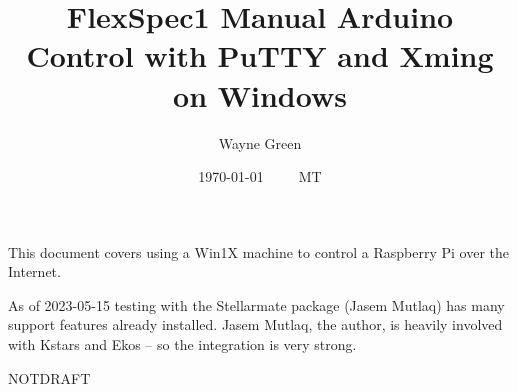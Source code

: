\documentclass[letter,11pt,oneside]{article}
\def\documentisdraft{NOTDRAFT}
\begin{document}


\title{FlexSpec1 Manual Arduino Control with PuTTY and Xming on Windows}
\author{Wayne Green}
\date{\today ~ ~ \currenttime~ MT}
\maketitle

This document covers using a Win1X machine to control a Raspberry Pi
over the Internet. 

As of 2023-05-15 testing with the Stellarmate package (Jasem Mutlaq)
has many support features already installed. Jasem Mutlaq, the author,
is heavily involved with Kstars and Ekos -- so the integration is
very strong.


 
\tableofcontents
\listoffigures
\newpage


\setcounter{section}{0}

\ifx\documentisdraft\drafttest
\linenumbers    %
\fi





{}
\renewcommand*{\refname}{My Bibliography and References}






\end{document}

